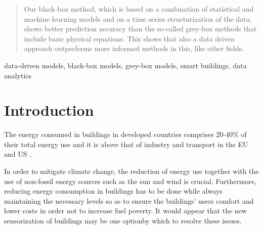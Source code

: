 \documentclass[10pt, conference, compsocconf]{IEEEtran}
\begin{document}
\begin{abstract}

Our black-box method, which is based on a combination of statistical and machine learning models and on a time series structurization of the data, shows better prediction accuracy than the so-called grey-box methods that include basic physical equations. This shows that also a data driven approach outperforms more informed methods in this, like other fields.

\end{abstract}

\begin{IEEEkeywords}
data-driven models, black-box models, grey-box models, smart buildings, data analytics

\end{IEEEkeywords}


%
\IEEEpeerreviewmaketitle



\section{Introduction} \label{intro}

The energy consumed in buildings in developed countries comprises 20-40\% of their total energy use and it is above that of industry and transport in the EU and US \cite{perez2008review, energyUS}. 

In order to mitigate climate change, the reduction of energy use together with the use of non-fossil energy sources such as the sun and wind is crucial. Furthermore, reducing energy consumption in buildings has to be done while always maintaining the necessary levels so as to ensure the buildings' users comfort and lower costs in order not to increase fuel poverty. It would appear that the new sensorization of buildings may be one optionby which to resolve these issues.
\end{document}
